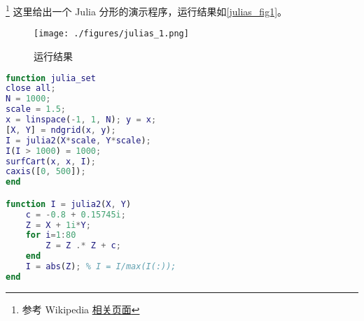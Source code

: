 
\begin{issues}
\issueDraft
\issueMissDepend
\end{issues}

\footnote{参考 Wikipedia \href{https://en.wikipedia.org/wiki/Julia_set}{相关页面}} 这里给出一个 Julia 分形的演示程序，运行结果如\autoref{julias_fig1}。


\begin{figure}[ht]
\centering
\texttt{[image: ./figures/julias\_1.png]}
\caption{运行结果} \label{julias_fig1}
\end{figure}

\begin{lstlisting}[language=matlab, caption=julia\_set.m]
function julia_set
close all;
N = 1000;
scale = 1.5;
x = linspace(-1, 1, N); y = x;
[X, Y] = ndgrid(x, y);
I = julia2(X*scale, Y*scale);
I(I > 1000) = 1000;
surfCart(x, x, I);
caxis([0, 500]);
end

function I = julia2(X, Y)
    c = -0.8 + 0.15745i;
    Z = X + 1i*Y;
    for i=1:80
        Z = Z .* Z + c;
    end
    I = abs(Z); % I = I/max(I(:));
end
\end{lstlisting}
